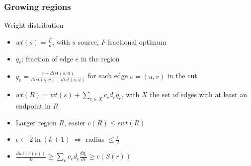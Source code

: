 \documentclass[12pt,aspectratio=169]{beamer}
\begin{document}
\begin{frame}\frametitle{Growing regions }
  \begin{block}{Weight distribution}
    \begin{itemize}
    \item
      $wt(s) = \frac{F}{k}$, with $s$ source, $F$ fractional optimum
    \item
      $q_{e}$: fraction of edge $e$ in the region
    \item
      $q_{e} = \frac{r - dist(s,u)}{dist(s,v) - dist(s,u)}$ for each edge $e=(u,v)$ in the cut
    \item
      $wt(R) = wt(s) + \sum_{e\in X} c_{e}d_{e}q_{e}$, with $X$ the set of edges with at
      least an endpoint in $R$
    \item
      Larger region $R$, easier $c(R) \le \epsilon wt(R)$
    \item
      $\epsilon \gets 2\ln (k+1)$ $\Rightarrow$ radius $\le \frac{1}{2}$
    \item
      $\frac{d wt(s(r))}{dr} \ge \sum_{e} c_{e}d_{e}\frac{d q_{e}}{dr} \ge c(S(r))$
    \end{itemize}
  \end{block}
\end{frame}
\end{document}
